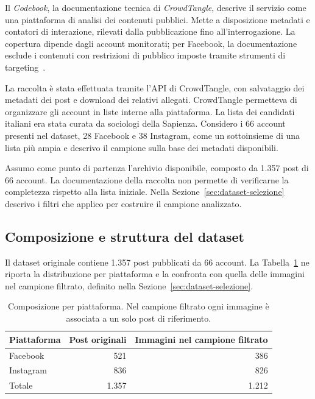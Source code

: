 Il \emph{Codebook}, la documentazione tecnica di \emph{CrowdTangle}, descrive il servizio come una piattaforma di analisi dei contenuti pubblici. Mette a disposizione metadati e contatori di interazione, rilevati dalla pubblicazione fino all'interrogazione. La copertura dipende dagli account monitorati; per Facebook, la documentazione esclude i contenuti con restrizioni di pubblico imposte tramite strumenti di targeting~\cite{DVN/SCCQYD_2019}.

La raccolta è stata effettuata tramite l'API di CrowdTangle, con salvataggio dei metadati dei post e download dei relativi allegati. CrowdTangle permetteva di organizzare gli account in liste interne alla piattaforma. La lista dei candidati italiani era stata curata da sociologi della Sapienza. Considero i 66 account presenti nel dataset, 28 Facebook e 38 Instagram, come un sottoinsieme di una lista più ampia e descrivo il campione sulla base dei metadati disponibili.

Assumo come punto di partenza l’archivio disponibile, composto da 1.357 post di 66 account. La documentazione della raccolta non permette di verificarne la completezza rispetto alla lista iniziale. Nella Sezione~\ref{sec:dataset-selezione} descrivo i filtri che applico per costruire il campione analizzato.

\subsection{Composizione e struttura del dataset}
\label{subsec:dataset-struttura}

Il dataset originale contiene 1.357 post pubblicati da 66 account. La Tabella~\ref{tab:dataset-piattaforme} ne riporta la distribuzione per piattaforma e la confronta con quella delle immagini nel campione filtrato, definito nella Sezione~\ref{sec:dataset-selezione}.

\begin{table}[htbp]
    \centering
    \caption{Composizione per piattaforma. Nel campione filtrato ogni immagine è associata a un solo post di riferimento.}
    \label{tab:dataset-piattaforme}
    \begin{tabular}{lrr}
        \toprule
        Piattaforma & Post originali & Immagini nel campione filtrato \\
        \midrule
        Facebook  & 521   & 386   \\
        Instagram & 836   & 826   \\
        \midrule
        Totale    & 1.357 & 1.212 \\
        \bottomrule
    \end{tabular}
\end{table}

